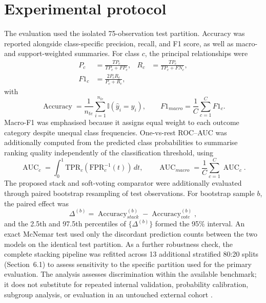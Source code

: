 \documentclass{elektr}
\begin{document}
\FloatBarrier
\section{Experimental protocol}
The evaluation used the isolated 75-observation test partition. Accuracy was reported alongside class-specific precision, recall, and F1 score, as well as macro- and support-weighted summaries. For class $c$, the principal relationships were
\begin{equation}
\begin{aligned}
P_c&=\frac{TP_c}{TP_c+FP_c}, &
R_c&=\frac{TP_c}{TP_c+FN_c},\\
F1_c&=\frac{2P_cR_c}{P_c+R_c},
\end{aligned}
\label{eq:classmetrics}
\end{equation}
with
\begin{equation}
\operatorname{Accuracy}=\frac{1}{n_{te}}\sum_{i=1}^{n_{te}}\mathbb{I}(\hat y_i=y_i),
\qquad
F1_{macro}=\frac{1}{C}\sum_{c=1}^{C}F1_c.
\label{eq:aggregatemetrics}
\end{equation}
Macro-F1 was emphasised because it assigns equal weight to each outcome category despite unequal class frequencies. One-vs-rest ROC--AUC was additionally computed from the predicted class probabilities to summarise ranking quality independently of the classification threshold, using
\begin{equation}
\operatorname{AUC}_c=\int_0^1 \mathrm{TPR}_c(\mathrm{FPR}_c^{-1}(t))\,dt,
\qquad
\operatorname{AUC}_{macro}=\frac{1}{C}\sum_{c=1}^{C}\operatorname{AUC}_c.
\label{eq:auc}
\end{equation}
The proposed stack and soft-voting comparator were additionally evaluated through paired bootstrap resampling of test observations. For bootstrap sample $b$, the paired effect was
\begin{equation}
\Delta^{(b)}=\operatorname{Accuracy}^{(b)}_{stack}
-\operatorname{Accuracy}^{(b)}_{vote},
\label{eq:bootstrap}
\end{equation}
and the 2.5th and 97.5th percentiles of $\{\Delta^{(b)}\}$ formed the 95\% interval. An exact McNemar test used only the discordant prediction counts between the two models on the identical test partition. As a further robustness check, the complete stacking pipeline was refitted across 13 additional stratified 80:20 splits (Section~6.1) to assess sensitivity to the specific partition used for the primary evaluation. The analysis assesses discrimination within the available benchmark; it does not substitute for repeated internal validation, probability calibration, subgroup analysis, or evaluation in an untouched external cohort \cite{collins2024,riley2024,rileysample2024}.
\end{document}
